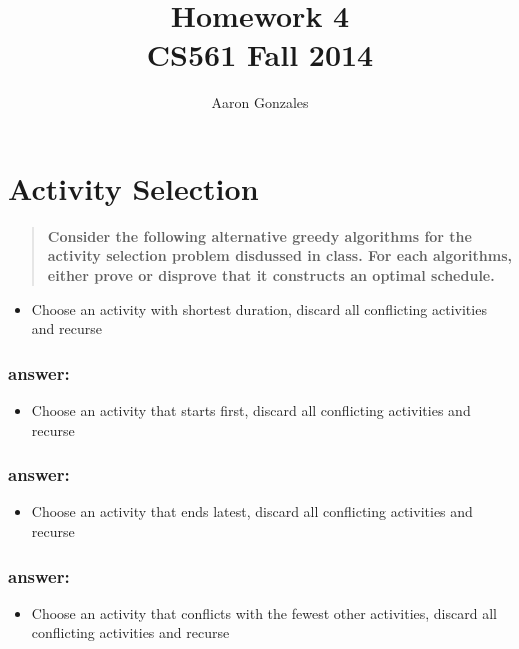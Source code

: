 \documentclass[titlepage]{article}\usepackage[]{graphicx}\usepackage[]{color}
\begin{document}
\title{Homework 4 \\ CS561 Fall 2014}
\author{Aaron Gonzales}
\maketitle


\section{Activity Selection}
\begin{quote}
  \textbf{ Consider the following alternative greedy algorithms for the
	activity selection problem disdussed in class. For each algorithms, either
  prove or disprove that it constructs an optimal schedule. }
\end{quote}

\begin{itemize}
  \item Choose an activity with shortest duration, discard all
	conflicting activities and recurse
\end{itemize}
\subsubsection{answer:}
\vspace{7 cm}

\begin{itemize}
  \item Choose an activity that starts first, discard all conflicting
	activities and recurse
\end{itemize}
\subsubsection{answer:}
\vspace{9 cm}

\begin{itemize}
  \item Choose an activity that ends latest, discard all conflicting
	activities and recurse
\end{itemize}
\subsubsection{answer:}
\vspace{7 cm}

\begin{itemize}
  \item Choose an activity that conflicts with the fewest other activities,
	  discard all conflicting activities and recurse
\end{itemize}
\end{document}
